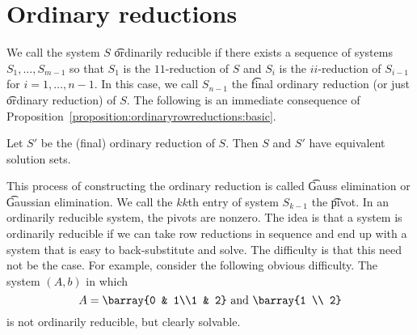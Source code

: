 \section*{Ordinary reductions}

We call the system $S$ \t{ordinarily reducible} if there exists a sequence of systems $S_1, \dots , S_{m-1}$ so that $S_1$ is the $11$-reduction of $S$ and $S_{i}$ is the $ii$-reduction of $S_{i-1}$ for $i = 1, \dots , n-1$.
In this case, we call $S_{n-1}$ the \t{final ordinary reduction} (or just \t{ordinary reduction}) of $S$.
The following is an immediate consequence of Proposition~\ref{proposition:ordinaryrowreductions:basic}.
\begin{proposition}

  \label{proposition:ordinary_row_reductions:main}Let $S'$ be the (final) ordinary reduction of $S$. Then $S$ and $S'$ have equivalent solution sets.\end{proposition}

This process of constructing the ordinary reduction is called \t{Gauss elimination} or \t{Gaussian elimination}.
We call the $kk$th entry of system $S_{k-1}$ the \t{pivot}.
In an ordinarily reducible system, the pivots are nonzero.
The idea is that a system is ordinarily reducible if we can take row reductions in sequence and end up with a system that is easy to back-substitute and solve.
The difficulty is that this need not be the case.
For example, consider the following obvious difficulty.
The system $(A, b)$ in which
    \[
A = \barray{0 & 1\\1 & 2} \text{ and } \barray{1 \\ 2}
    \]
is not ordinarily reducible, but clearly solvable.
